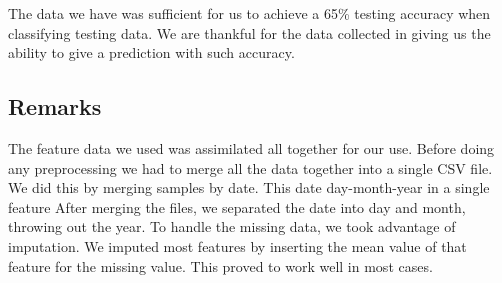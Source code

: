 \documentclass{article} %
\begin{document}
The data we have was sufficient for us to achieve a 65\% testing accuracy when classifying testing data.  We are thankful for the data collected in giving us the ability to give a prediction with such accuracy. 


%
%
%
%
\subsection{Remarks}
The feature data we used was assimilated all together for our use.  Before doing any preprocessing we had to merge all the data together into a single CSV file.  We did this by merging samples by date.  This date day-month-year in a single feature  After merging the files, we separated the date into day and month, throwing out the year. 
To handle the missing data, we took advantage of imputation.  We imputed most features by inserting the mean value of that feature for the missing value.  This proved to work well in most cases.
\end{document}
